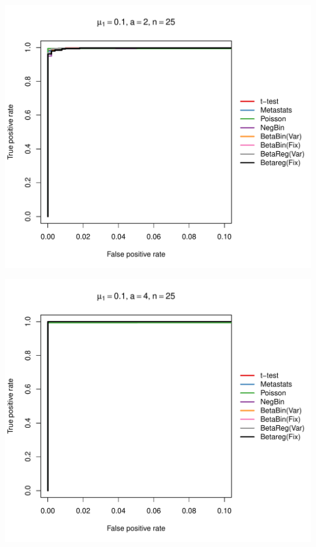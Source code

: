 \documentclass[12pt]{article}\usepackage{graphicx, color}
\makeatletter
\def\maxwidth{ %
  \ifdim\Gin@nat@width>\linewidth
    \linewidth
  \else
    \Gin@nat@width
  \fi
}
\newenvironment{knitrout}{}{} %
\makeatother
\begin{document}
\begin{knitrout}
{\centering \includegraphics[width=\maxwidth]{figure/rocs29} 

}




{\centering \includegraphics[width=\maxwidth]{figure/rocs30} 

}





\end{knitrout}
\end{document}

